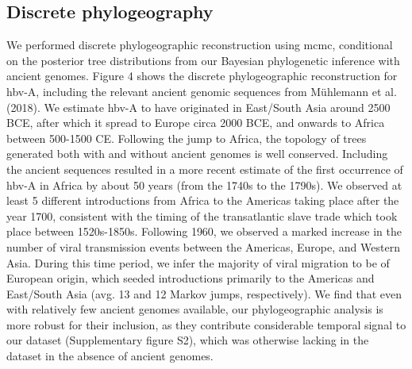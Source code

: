 \subsection{Discrete phylogeography}
We performed discrete phylogeographic reconstruction using \gls{mcmc}, conditional on the posterior tree distributions from our Bayesian phylogenetic inference with ancient genomes. Figure 4 shows the discrete phylogeographic reconstruction for \gls{hbv}-A, including the relevant ancient genomic sequences from Mühlemann et al. (2018). We estimate \gls{hbv}-A to have originated in East/South Asia around 2500 BCE, after which it spread to Europe circa 2000 BCE, and onwards to Africa between 500-1500 CE. Following the jump to Africa, the topology of trees generated both with and without ancient genomes is well conserved. Including the ancient sequences resulted in a more recent estimate of the first occurrence of \gls{hbv}-A in Africa by about 50 years (from the 1740s to the 1790s). We observed at least 5 different introductions from Africa to the Americas taking place after the year 1700, consistent with the timing of the transatlantic slave trade which took place between 1520s-1850s. Following 1960, we observed a marked increase in the number of viral transmission events between the Americas, Europe, and Western Asia. During this time period, we infer the majority of viral migration to be of European origin, which seeded introductions primarily to the Americas and East/South Asia (avg. 13 and 12 Markov jumps, respectively). We find that even with relatively few ancient genomes available, our phylogeographic analysis is more robust for their inclusion, as they contribute considerable temporal signal to our dataset (Supplementary figure S2), which was otherwise lacking in the dataset in the absence of ancient genomes. 


